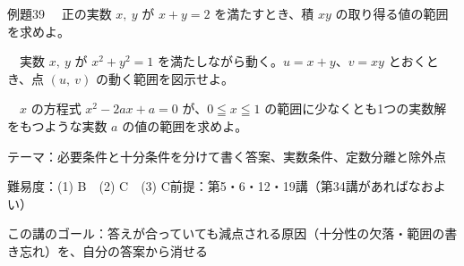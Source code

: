 \documentclass[paper=b5j, fontsize=8pt, fleqn, twoside]{jlreq}
\begin{document}
\begin{ascolorbox4A}[出典：オリジナル]{例題39}
  　正の実数 $x,\ y$ が $x+y=2$ を満たすとき、積 $xy$ の取り得る値の範囲を求めよ。\par
  　実数 $x,\ y$ が $x^2+y^2=1$ を満たしながら動く。$u=x+y$、$v=xy$ とおくとき、点 $(u,\ v)$ の動く範囲を図示せよ。\par
  　$x$ の方程式 $x^2-2ax+a=0$ が、$0\leqq x\leqq1$ の範囲に少なくとも1つの実数解をもつような実数 $a$ の値の範囲を求めよ。
\end{ascolorbox4A}

\begin{Data}
  テーマ：必要条件と十分条件を分けて書く答案、実数条件、定数分離と除外点\par
  難易度：(1) B　(2) C　(3) C\quad 前提：第5・6・12・19講（第34講があればなおよい）\par
  この講のゴール：答えが合っていても減点される原因（十分性の欠落・範囲の書き忘れ）を、自分の答案から消せる
\end{Data}
\end{document}
